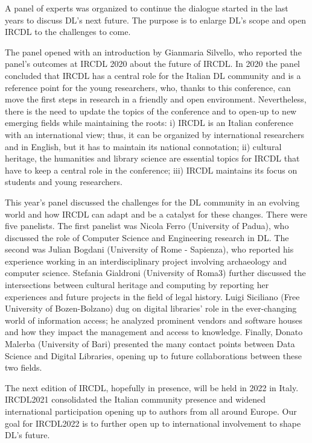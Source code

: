 \documentclass{sig-alternate-10pt}
\begin{document}
A panel of experts was organized to continue the dialogue started in the last years to discuss DL's next future. The purpose is to enlarge DL's scope and open IRCDL to the challenges to come.

The panel opened with an introduction by Gianmaria Silvello, who reported the panel's outcomes at IRCDL 2020 about the future of IRCDL. In 2020 the panel concluded that IRCDL has a central role for the Italian DL community and is a reference point for the young researchers, who, thanks to this conference, can move the first steps in research in a friendly and open environment. Nevertheless, there is the need to update the topics of the conference and to open-up to new emerging fields while maintaining the roots: i) IRCDL is an Italian conference with an international view; thus, it can be organized by international researchers and in English, but it has to maintain its national connotation; ii) cultural heritage, the humanities and library science are essential topics for IRCDL that have to keep a central role in the conference; iii) IRCDL maintains its focus on students and young researchers. 

This year's panel discussed the challenges for the DL community in an evolving world and how IRCDL can adapt and be a catalyst for these changes. There were five panelists. The first panelist was Nicola Ferro (University of Padua), who discussed the role of Computer Science and Engineering research in DL. The second was Julian Bogdani (University of Rome - Sapienza), who reported his experience working in an interdisciplinary project involving archaeology and computer science. Stefania Gialdroni (University of Roma3) further discussed the intersections between cultural heritage and computing by reporting her experiences and future projects in the field of legal history. Luigi Siciliano (Free University of Bozen-Bolzano) dug on digital libraries' role in the ever-changing world of information access; he analyzed prominent vendors and software houses and how they impact the management and access to knowledge. Finally, Donato Malerba (University of Bari) presented the many contact points between Data Science and Digital Libraries, opening up to future collaborations between these two fields. 

The next edition of IRCDL, hopefully in presence, will be held in 2022 in Italy. IRCDL2021 consolidated the Italian community presence and widened international participation opening up to authors from all around Europe. Our goal for IRCDL2022 is to further open up to international involvement to shape DL's future. 
\end{document}
